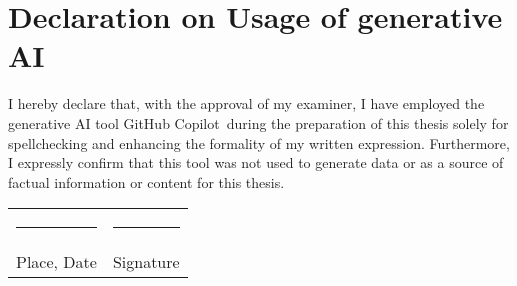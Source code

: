 \chapter*{Declaration on Usage of generative AI}

I hereby declare that, with the approval of my examiner, I have employed the
generative AI tool \dq GitHub Copilot\dq\ during the preparation of this thesis
solely for spellchecking and enhancing the formality of my written expression.
Furthermore, I expressly confirm that this tool was not used to generate data
or as a source of factual information or content for this thesis.\\[3\normalbaselineskip]
\begin{tabular}{p{} l}
    \rule{\textwidth/3}{0.4pt} & \rule{\textwidth/3}{0.4pt} \\
    Place, Date                & Signature
\end{tabular}